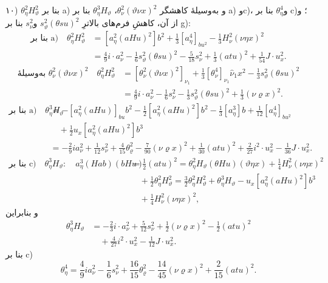 \documentclass[11pt]{article}
\begin{document}
\noindent ۱۰) $\theta_\eta^2H_\vartheta^2$ بنا بر a) و به‌وسیلهٔ کاهشگر $\theta_\nu^2(\vartheta\nu x)^2$، $\theta_\eta^3H_\vartheta$ بنا بر a) وc)، و$\theta_\eta^4$ بنا بر c)؛ و از آن، کاهشِ فرم‌های بالاترِ $s_\vartheta^2(\theta su)^2$ و$s_\nu^2$ بنا بر g):
\[
\begin{aligned}
\text{بنا بر a)}\quad
\theta_\eta^2H_\vartheta^2&=[a_\eta^2(aHu)^2]b^2+\frac13[a_\eta^4]_{bu^2}-\frac13H_\nu^2(\nu\eta x)^2\\
&=\frac49i\cdot a_\nu^2-\frac16s_\vartheta^2(\theta su)^2-\frac5{18}s_\nu^2+\frac13(atu)^2+\frac1{54}J\cdot u_x^2.
\end{aligned}
\]
\[
\begin{aligned}
\text{به‌وسیلهٔ }\theta_\nu^2(\vartheta\nu x)^2\quad
\theta_\eta^2H_\vartheta^2
&=[\theta_\nu^2(\vartheta\nu x)^2]_{\nu_1}+\frac13[\theta_\nu^4]_{\nu_1}\widehat{\nu}_1x^2-\frac13s_\vartheta^2(\theta su)^2\\
&=\frac49i\cdot a_\nu^2-\frac16s_\nu^2-\frac13s_\vartheta^2(\theta su)^2+\frac13(\nu\varrho x)^2.
\end{aligned}
\]
\[
\begin{aligned}
\text{بنا بر a)}\quad
\theta_\eta^3H_\vartheta&=-[a_\eta^2(aHu)]_{bu}b^2-\frac12[a_\eta^2(aHu)^2]b^2-\frac13[a_\eta^3]b+\frac1{12}[a_\eta^4]_{bu^2}\\
&\quad+\frac12u_x[a_\eta^2(aHu)^2]b^3\\
&=-\frac29ia_\nu^2+\frac1{12}s_\nu^2+\frac4{15}\theta_\varrho^2-\frac7{90}(\nu\varrho x)^2+\frac1{30}(atu)^2+\frac2{27}i^2\cdot u_x^2-\frac1{36}J\cdot u_x^2.
\end{aligned}
\]
\[
\begin{aligned}
\text{بنا بر c)}\quad
\theta_\eta^3H_\vartheta:\quad a_\eta^3(Hab)(bHu)&=\frac12(atu)^2
=\theta_\eta^2H_\vartheta(\theta Hu)(\vartheta\eta x)+\frac14H_\nu^2(\nu\eta x)^2\\
&\quad+\frac12\theta_\eta^2H_\vartheta^2
=\frac32\theta_\eta^2H_\vartheta^2+\theta_\eta^3H_\vartheta-u_x[a_\eta^2(aHu)^2]b^3\\
&\quad+\frac14H_\nu^2(\nu\eta x)^2,
\end{aligned}
\]
و بنابراین
\[
\begin{aligned}
\theta_\eta^3H_\vartheta&=-\frac23i\cdot a_\nu^2+\frac5{12}s_\nu^2+\frac12(\nu\varrho x)^2-\frac12(atu)^2\\
&\quad+\frac4{27}i^2\cdot u_x^2-\frac1{12}J\cdot u_x^2.
\end{aligned}
\]
بنا بر c)
\[
\theta_\eta^4=\frac49ia_\nu^2-\frac16s_\nu^2+\frac{16}{15}\theta_\varrho^2-\frac{14}{45}(\nu\varrho x)^2+\frac2{15}(atu)^2.
\]
\end{document}
